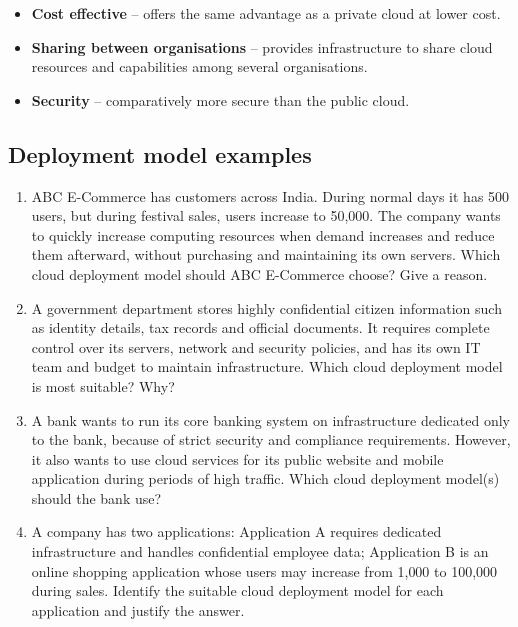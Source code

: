 \documentclass[11pt,a4paper]{article}
\begin{document}


\begin{itemize}\itemsep2pt
  \item \textbf{Cost effective} -- offers the same advantage as a private cloud at lower cost.
  \item \textbf{Sharing between organisations} -- provides infrastructure to share cloud
        resources and capabilities among several organisations.
  \item \textbf{Security} -- comparatively more secure than the public cloud.
\end{itemize}


\subsection*{Deployment model examples}

\begin{enumerate}\itemsep6pt
  \item ABC E-Commerce has customers across India. During normal days it has 500 users, but
        during festival sales, users increase to 50{,}000. The company wants to quickly
        increase computing resources when demand increases and reduce them afterward, without
        purchasing and maintaining its own servers. Which cloud deployment model should ABC
        E-Commerce choose? Give a reason.
  \item A government department stores highly confidential citizen information such as
        identity details, tax records and official documents. It requires complete control
        over its servers, network and security policies, and has its own IT team and budget
        to maintain infrastructure. Which cloud deployment model is most suitable? Why?
  \item A bank wants to run its core banking system on infrastructure dedicated only to the
        bank, because of strict security and compliance requirements. However, it also wants
        to use cloud services for its public website and mobile application during periods of
        high traffic. Which cloud deployment model(s) should the bank use?
  \item A company has two applications: Application A requires dedicated infrastructure and
        handles confidential employee data; Application B is an online shopping application
        whose users may increase from 1{,}000 to 100{,}000 during sales. Identify the suitable
        cloud deployment model for each application and justify the answer.
\end{enumerate}
\end{document}
